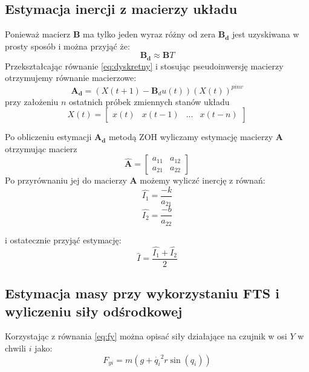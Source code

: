 \documentclass[a4paper, 10pt]{article}
\begin{document}
\subsection{Estymacja inercji z macierzy układu}
\label{sec:pos}
Ponieważ macierz $\mathbf{B}$ ma tylko jeden wyraz różny od zera $\mathbf{B_d}$ jest uzyskiwana w prosty sposób i można przyjąć że:
\begin{equation}
\mathbf{B_d} \approx \mathbf{B}T
\end{equation}
Przekształcając równanie \ref{eq:dyskretny} i stosując pseudoinwersję macierzy otrzymujemy równanie macierzowe:
\begin{equation}
\mathbf{A_d} = (X(t+1) - \mathbf{B}_du(t))(X(t))^{pinv}
\label{eq:pinv}
\end{equation}
przy założeniu $n$ ostatnich próbek zmiennych stanów układu
\begin{equation}
X(t) = 	\begin{bmatrix}
x(t) & x(t-1)  & ... & x(t-n)
\end{bmatrix}
\label{eq:xk}
\end{equation}

Po obliczeniu estymacji $\mathbf{A_d}$ metodą ZOH wyliczamy estymację macierzy $\mathbf{A}$ otrzymując macierz
\begin{equation}
\mathbf{\hat{A}} = 	\begin{bmatrix}
a_{11} & a_{12}\\
a_{21} & a_{22}
\end{bmatrix}
\end{equation}
Po przyrównaniu jej do macierzy $\mathbf{A}$ możemy wyliczć inercję z równań:
\begin{equation}
\hat{I_1} = \frac{-k}{a_{21}}
\end{equation}
\begin{equation}
\hat{I_2} = \frac{-b}{a_{22}}
\end{equation}

i ostatecznie przyjąć estymację:
\begin{equation}
\hat{I} = \frac{\hat{I_1}+\hat{I_2}}{2}
\end{equation}


\subsection{Estymacja masy przy wykorzystaniu FTS i wyliczeniu siły odśrodkowej}
\label{sec:ftsods}
Korzystając z równania \ref{eq:fy} można opisać siły działające na czujnik w osi $Y$ w chwili $i$ jako:
\begin{equation}
F_{yi}  = m(g + \dot{q_i}^2r\sin{(q_i)})
\end{equation}
\end{document}
